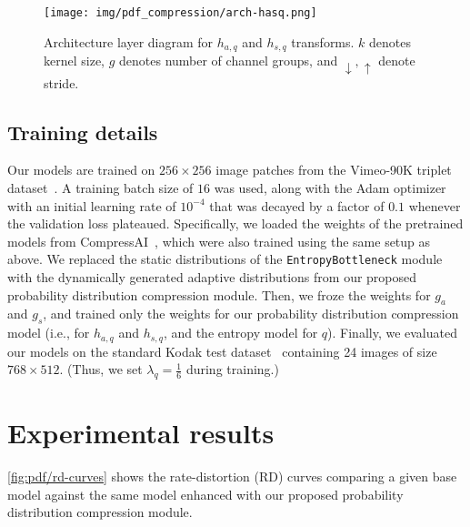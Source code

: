 \begin{figure}[htbp]
  \centering
  \texttt{[image: img/pdf\_compression/arch-hasq.png]}
  \caption[Architecture layer diagram for $h_{a,q}$ and $h_{s,q}$ transforms]{%
    Architecture layer diagram for $h_{a,q}$ and $h_{s,q}$ transforms.
    $k$ denotes kernel size, $g$ denotes number of channel groups, and $\downarrow, \uparrow$ denote stride.%
  }
  \label{fig:pdf/arch-hasq}
\end{figure}




\subsection{Training details}
\label{sec:pdf_compression/experimental_setup/training_details}

Our models are trained on $256 \times 256$ image patches from the Vimeo-90K triplet dataset~\cite{xue2019video}.
A training batch size of $16$ was used, along with the Adam optimizer~\cite{kingma2014adam} with an initial learning rate of $10^{-4}$ that was decayed by a factor of $0.1$ whenever the validation loss plateaued.
Specifically, we loaded the weights of the pretrained models from CompressAI~\cite{begaint2020compressai}, which were also trained using the same setup as above.
We replaced the static distributions of the \texttt{EntropyBottleneck} module with the dynamically generated adaptive distributions from our proposed probability distribution compression module.
Then, we froze the weights for $g_a$ and $g_s$, and trained only the weights for our probability distribution compression model (i.e., for $h_{a,q}$ and $h_{s,q}$, and the entropy model for $q$).
Finally, we evaluated our models on the standard Kodak test dataset~\cite{kodak_dataset} containing 24 images of size $768 \times 512$.
(Thus, we set $\lambda_q = \frac{1}{6}$ during training.)




\section{Experimental results}
\label{sec:pdf_compression/experimental_results}

\cref{fig:pdf/rd-curves} shows the rate-distortion (RD) curves comparing a given base model against the same model enhanced with our proposed probability distribution compression module.


